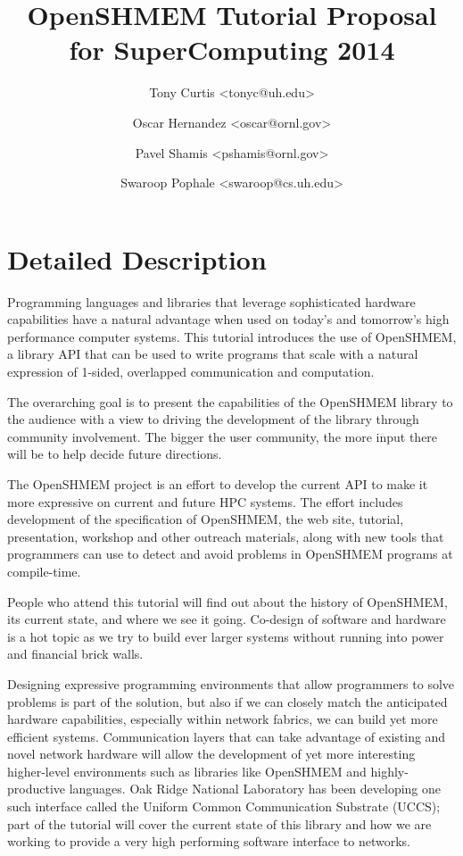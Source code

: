 \documentclass[10pt,english]{article}
\begin{document}
\title{OpenSHMEM Tutorial Proposal for SuperComputing 2014}
\author{Tony Curtis <tonyc@uh.edu> \and Oscar Hernandez <oscar@ornl.gov> \and Pavel Shamis <pshamis@ornl.gov> \and Swaroop Pophale <swaroop@cs.uh.edu>}

\maketitle

\section{Detailed Description}

Programming languages and libraries that leverage sophisticated
hardware capabilities have a natural advantage when used on today's
and tomorrow's high performance computer systems.  This tutorial
introduces the use of OpenSHMEM, a library API that can be used to
write programs that scale with a natural expression of 1-sided,
overlapped communication and computation.

The overarching goal is to present the capabilities of the OpenSHMEM
library to the audience with a view to driving the development of the
library through community involvement.  The bigger the user community,
the more input there will be to help decide future directions.

The OpenSHMEM project is an effort to develop the current API to make
it more expressive on current and future HPC systems.  The effort
includes development of the specification of OpenSHMEM, the web site,
tutorial, presentation, workshop and other outreach materials, along
with new tools that programmers can use to detect and avoid problems
in OpenSHMEM programs at compile-time.

People who attend this tutorial will find out about the history of
OpenSHMEM, its current state, and where we see it going.  Co-design of
software and hardware is a hot topic as we try to build ever larger
systems without running into power and financial brick walls.

Designing expressive programming environments that allow programmers
to solve problems is part of the solution, but also if we can closely
match the anticipated hardware capabilities, especially within network
fabrics, we can build yet more efficient systems.  Communication
layers that can take advantage of existing and novel network hardware
will allow the development of yet more interesting higher-level
environments such as libraries like OpenSHMEM and highly-productive
languages.  Oak Ridge National Laboratory has been developing one such
interface called the Uniform Common Communication Substrate (UCCS);
part of the tutorial will cover the current state of this library and
how we are working to provide a very high performing software
interface to networks.
\end{document}
